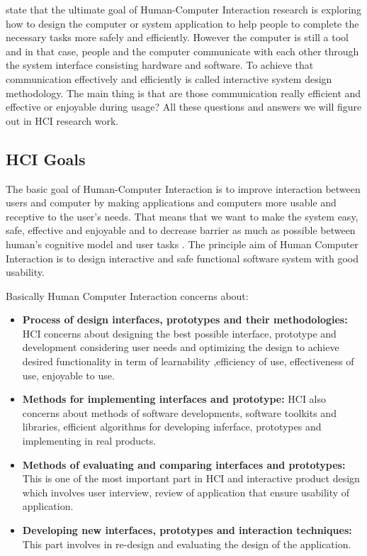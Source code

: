\citet{Yang2009} state that the ultimate goal of Human-Computer Interaction
research is exploring how to design the computer or system application to help
people to complete the necessary tasks more safely and efficiently. However the
computer is still a tool and in that case, people and the computer communicate
with each other through the system interface consisting hardware and software. To
achieve that communication effectively and efficiently is called interactive
system design methodology. The main thing is that are those communication really
efficient and effective or enjoyable during usage? All these questions
and answers we will figure out in HCI research work.


\subsection{HCI Goals}
The basic goal of Human-Computer Interaction is to improve interaction between
users and computer  by making applications and computers more usable and
receptive to the user's needs. That means that we want to make the system easy,
safe, effective and enjoyable and to decrease  barrier as much as possible
between human's cognitive model and  user tasks \cite{Sandrahci}. The principle
aim of Human Computer Interaction is to design interactive and safe functional
software system with good usability.

Basically Human Computer Interaction concerns about:
\begin{itemize}
\item \textbf{Process of design interfaces, prototypes and their methodologies:}
HCI concerns about designing the best possible interface, prototype and
development considering user needs and  optimizing the design to achieve desired
functionality in term of learnability ,efficiency of use, effectiveness of use,
enjoyable to use.
\item \textbf{Methods for implementing interfaces and prototype:} HCI also
concerns about methods of software developments, software toolkits and
libraries, efficient algorithms for developing inferface, prototypes and
implementing in real products.
\item \textbf{Methods of evaluating and comparing interfaces and prototypes:}
This is one of the most important part in HCI and interactive product design
which involves user interview, review of application that ensure usability of
application.
\item \textbf{Developing new interfaces, prototypes and interaction techniques:}
This part involves in re-design and evaluating the design of the application.
\end{itemize}


